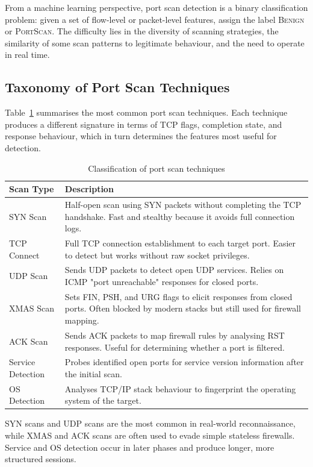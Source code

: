 From a machine learning perspective, port scan detection is a binary classification problem: given a set of flow-level or packet-level features, assign the label \textsc{Benign} or \textsc{PortScan}. The difficulty lies in the diversity of scanning strategies, the similarity of some scan patterns to legitimate behaviour, and the need to operate in real time.

\subsection{Taxonomy of Port Scan Techniques}

Table~\ref{tab:scan_taxonomy} summarises the most common port scan techniques. Each technique produces a different signature in terms of TCP flags, completion state, and response behaviour, which in turn determines the features most useful for detection.

\begin{table}[H]
\centering
\caption{Classification of port scan techniques}
\label{tab:scan_taxonomy}
\begin{tabularx}{\textwidth}{lX}
\toprule
\textbf{Scan Type} & \textbf{Description} \\
\midrule
SYN Scan & Half-open scan using SYN packets without completing the TCP handshake. Fast and stealthy because it avoids full connection logs. \\
TCP Connect & Full TCP connection establishment to each target port. Easier to detect but works without raw socket privileges. \\
UDP Scan & Sends UDP packets to detect open UDP services. Relies on ICMP "port unreachable" responses for closed ports. \\
XMAS Scan & Sets FIN, PSH, and URG flags to elicit responses from closed ports. Often blocked by modern stacks but still used for firewall mapping. \\
ACK Scan & Sends ACK packets to map firewall rules by analysing RST responses. Useful for determining whether a port is filtered. \\
Service Detection & Probes identified open ports for service version information after the initial scan. \\
OS Detection & Analyses TCP/IP stack behaviour to fingerprint the operating system of the target. \\
\bottomrule
\end{tabularx}
\end{table}

SYN scans and UDP scans are the most common in real-world reconnaissance, while XMAS and ACK scans are often used to evade simple stateless firewalls. Service and OS detection occur in later phases and produce longer, more structured sessions.

